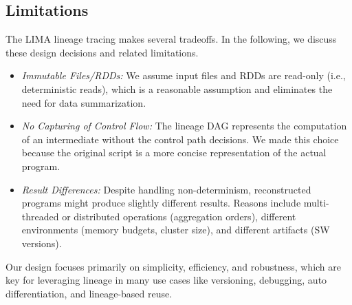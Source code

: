 \subsection{Limitations}
\label{sec:limits1}

The LIMA lineage tracing makes several tradeoffs. In the following, we discuss these design decisions and related limitations.
\begin{itemize}
\item \emph{Immutable Files/RDDs:} We assume input files and RDDs are read-only (i.e., deterministic reads), which is a reasonable assumption and eliminates the need for data summarization. 
\item \emph{No Capturing of Control Flow:} The lineage DAG represents the computation of an intermediate without the control path decisions. We made this choice because the original script is a more concise representation of the actual program.
\item \emph{Result Differences:} Despite handling non-determinism, reconstructed programs might produce slightly different results. Reasons include multi-threaded or distributed operations (aggregation orders), different environments (memory budgets, cluster size), and different artifacts (SW versions).
\end{itemize}
Our design focuses primarily on simplicity, efficiency, and robustness, which are key for leveraging lineage in many use cases like versioning, debugging, auto differentiation, and lineage-based reuse. 

